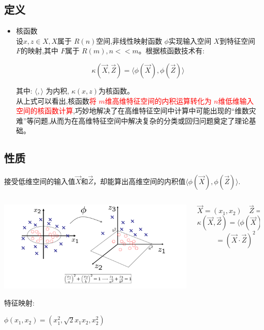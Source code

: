 \documentclass[12pt,a4paper,CJK]{beamer}
\begin{document}
\begin{CJK*}{UTF8}{gkai}
\subsection{定义}
\begin{frame}{\subsecname}
	\begin{itemize}
	\item 核函数\\
		设$x,z \in X, X$属于 $R(n)$空间,非线性映射函数 $\phi$实现输入空间 $X$到特征空间 $F$的映射,其中 $F$属于 $R(m), n<<m$。根据核函数技术有:
		\begin{displaybox}{90mm}
		\[ 
			\kappa(\vec{X},\vec{Z}) =\langle \phi(\vec{X}),\phi(\vec{Z})\rangle
		\]
		\end{displaybox}
		其中: $\langle, \rangle$ 为内积, $\kappa(x,z)$为核函数。\\
		从上式可以看出,核函数\textcolor{red}{将 $m$维高维特征空间的内积运算转化为 $n$维低维输入空间的核函数计算},巧妙地解决了在高维特征空间中计算中可能出现的“维数灾难”等问题,从而为在高维特征空间中解决复杂的分类或回归问题奠定了理论基础。
	\end{itemize}
\end{frame}


\subsection{性质}
\begin{frame}{\subsecname}
接受低维空间的输入值$\vec{X}$和$\vec{Z}$，却能算出高维空间的内积值$\langle \phi(\vec{X}),\phi(\vec{Z})\rangle$.
\begin{columns}
  \begin{column}{.50\textwidth}
    \includegraphics[scale=0.35]{figs/projection.png}
    \smallskip

    特征映射: \\
  	\begin{onlinebox}{55mm} 
  		$\displaystyle  
  			\phi(x_1,x_2)=(x_1^2,\sqrt{2}x_1x_2,x_2^2)
  		$
  	\end{onlinebox}
  \end{column}
\pause
  \begin{column}{.50\textwidth}
  \begin{definition}
  		\[
  			\vec{X} =(x_1,x_2) \quad \vec{Z} ={z_1,z_2} 
  		\]\[
			\kappa(\vec{X},\vec{Z}) =\langle \phi(\vec{X}),\phi(\vec{Z})\rangle	
		\]\[\qquad =(\vec{X}\cdot\vec{Z})^2
		\]


\end{definition}
\end{column}
\end{columns}
\end{frame}
\end{CJK*}
\end{document}
